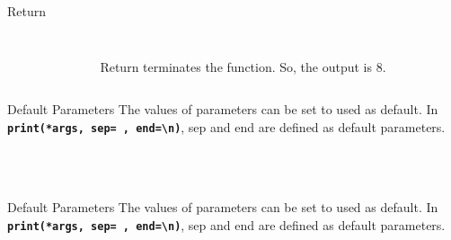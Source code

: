         \begin{frame}{Return}
            \begin{columns}
                \begin{column}{0.50\textwidth}
                    \inputminted[frame=single,framesep=2pt, lastline=15]{python3}{code-examples/return2.py}  
                    \pause
                \end{column}
                \begin{column}{0.50\textwidth}
                    \inputminted[frame=single,framesep=2pt, lastline=15]{python3}{code-examples/return3.py}
                    \pause
                    Return terminates the function. So, the output is 8.
                \end{column}
            \end{columns}
        \end{frame}

        \begin{frame}{Default Parameters}
            The values of parameters can be set to used as default.
            \newline
            In \textbf{\texttt{print(*args, sep=\textquotesingle \ \textquotesingle, end=\textquotesingle \textbackslash n\textquotesingle )}}, 
            sep and end are defined as default parameters.
            \inputminted[frame=single,framesep=2pt, lastline=15]{python3}{code-examples/default.py}
            \begin{columns}
                \begin{column}{0.50\textwidth}
                    \pause
                    \inputminted[frame=single,framesep=2pt, lastline=15]{python3}{code-examples/valid1.py}  
                \end{column}
                \begin{column}{0.50\textwidth}
                    \inputminted[frame=single,framesep=2pt, lastline=15]{python3}{code-examples/valid1_1.py}                    
                \end{column}
            \end{columns}
        \end{frame}

        \begin{frame}{Default Parameters}
            The values of parameters can be set to used as default.
            \newline
            In \textbf{\texttt{print(*args, sep=\textquotesingle \ \textquotesingle, end=\textquotesingle \textbackslash n\textquotesingle )}}, 
            sep and end are defined as default parameters.
            \inputminted[frame=single,framesep=2pt, lastline=15]{python3}{code-examples/default.py}
            \pause
            \inputminted[frame=single,framesep=2pt, lastline=15]{python3}{code-examples/valid2.py}  
        \end{frame}

